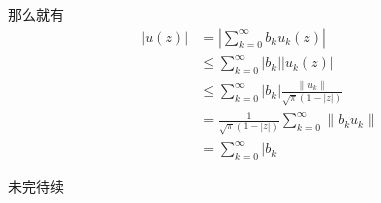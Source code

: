 \begin{exercise}
\begin{enumerate}
那么就有
\begin{align*}
|u(z)|&=|\sum_{k=0}^{\infty}b_ku_k(z)|\\
&\leq\sum_{k=0}^{\infty}|b_k||u_k(z)|\\
&\leq\sum_{k=0}^{\infty}|b_k|\frac{\|u_k\|}{\sqrt{\pi}(1-|z|)}\\
&=\frac{1}{\sqrt{\pi}(1-|z|)}\sum_{k=0}^{\infty}\|b_ku_k\|\\
&=\sum_{k=0}^{\infty}|b_k
\end{align*}


未完待续
\end{enumerate}
\end{exercise}



